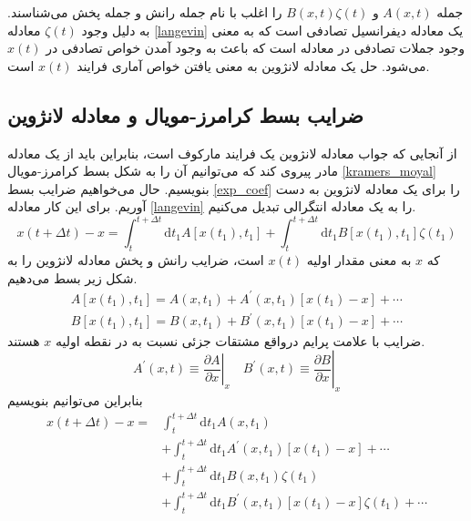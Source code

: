 جمله $A(x,t)$ و $B(x,t)\zeta(t)$ را اغلب با نام جمله رانش و جمله پخش می‌شناسند. به دلیل وجود $\zeta(t)$ معادله \ref{langevin} یک معادله دیفرانسیل تصادفی است که به معنی وجود جملات تصادفی در معادله است که باعث به وجود آمدن خواص تصادفی در $x(t)$ می‌شود. حل یک معادله لانژوین به معنی یافتن خواص آماری فرایند $x(t)$ است.

\subsection{ضرایب بسط کرامرز-مویال و معادله لانژوین}

از آنجایی که جواب معادله لانژوین یک فرایند مارکوف است، بنابراین باید از یک معادله مادر پیروی کند که می‌توانیم آن را به شکل بسط کرامرز-مویال \ref{kramers_moyal} بنویسیم. حال می‌خواهیم ضرایب بسط \ref{exp_coef} را برای یک معادله لانژوین به دست آوریم. برای این کار معادله \ref{langevin} را به یک معادله انتگرالی تبدیل می‌کنیم.
\begin{equation}
  x(t+\Delta t)-x=\int_{t}^{t+\Delta t} \mathrm{d} t_{1} A\left[x\left(t_{1}\right), t_{1}\right]+\int_{t}^{t+\Delta t} \mathrm{d} t_{1} B\left[x\left(t_{1}\right), t_{1}\right] \zeta\left(t_{1}\right)
  \label{integral_langevin}
\end{equation}
که $x$ به معنی مقدار اولیه $x(t)$ است، ضرایب رانش و پخش معادله لانژوین را به شکل زیر بسط می‌دهیم.
$$
\begin{array}{l}{A\left[x\left(t_{1}\right), t_{1}\right]=A\left(x, t_{1}\right)+A^{\prime}\left(x, t_{1}\right)\left[x\left(t_{1}\right)-x\right]+\cdots} \\ {B\left[x\left(t_{1}\right), t_{1}\right]=B\left(x, t_{1}\right)+B^{\prime}\left(x, t_{1}\right)\left[x\left(t_{1}\right)-x\right]+\cdots}\end{array}
$$
ضرایب با علامت پرایم در‌واقع مشتقات جزئی نسبت به در نقطه اولیه $x$ هستند.
$$
\left.\left.A^{\prime}(x, t) \equiv \frac{\partial A}{\partial x}\right|_{x} \quad B^{\prime}(x, t) \equiv \frac{\partial B}{\partial x}\right|_{x}
$$
بنابراین می‌توانیم بنویسیم
$$
\begin{aligned} x(t+\Delta t)-x=& \int_{t}^{t+\Delta t} \mathrm{d} t_{1} A\left(x, t_{1}\right) \\ &+\int_{t}^{t+\Delta t} \mathrm{d} t_{1} A^{\prime}\left(x, t_{1}\right)\left[x\left(t_{1}\right)-x\right]+\cdots \\ &+\int_{t}^{t+\Delta t} \mathrm{d} t_{1} B\left(x, t_{1}\right) \zeta\left(t_{1}\right) \\ &+\int_{t}^{t+\Delta t} \mathrm{d} t_{1} B^{\prime}\left(x, t_{1}\right)\left[x\left(t_{1}\right)-x\right] \zeta\left(t_{1}\right)+\cdots \end{aligned}
$$
